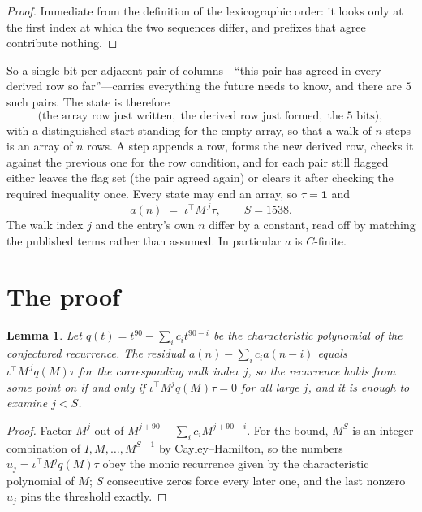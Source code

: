 \documentclass[11pt,a4paper]{article}
\theoremstyle{plain}
\newtheorem{lemma}[theorem]{Lemma}
\theoremstyle{definition}
\begin{document}
\begin{proof}
Immediate from the definition of the lexicographic order: it looks only at the first index at
which the two sequences differ, and prefixes that agree contribute nothing.
\end{proof}

So a single bit per adjacent pair of columns---``this pair has agreed in every derived row so
far''---carries everything the future needs to know, and there are $5$ such pairs. The state
is therefore
\[
\bigl(\text{the array row just written},\; \text{the derived row just formed},\;
\text{the 5 bits}\bigr),
\]
with a distinguished start standing for the empty array, so that a walk of $n$ steps is an array
of $n$ rows. A step appends a row, forms the new derived row, checks it against the previous one
for the row condition, and for each pair still flagged either leaves the flag set (the pair
agreed again) or clears it after checking the required inequality once. Every state may end an
array, so $\tau=\mathbf{1}$ and
\[
a(n)\;=\;\iota^{\!\top}M^{\,j}\tau ,\qquad S=1538.
\]
The walk index $j$ and the entry's own $n$ differ by a constant, read off by matching the
published terms rather than assumed. In particular $a$ is $C$-finite.

\section{The proof}

\begin{lemma}\label{lem:crit}
Let $q(t)=t^{90}-\sum_i c_it^{90-i}$ be the characteristic polynomial of the
conjectured recurrence. The residual $a(n)-\sum_ic_ia(n-i)$ equals
$\iota^{\!\top}M^{\,j}q(M)\tau$ for the corresponding walk index $j$, so the recurrence
holds from some point on if and only if $\iota^{\!\top}M^{j}q(M)\tau=0$ for all large $j$,
and it is enough to examine $j<S$.
\end{lemma}

\begin{proof}
Factor $M^{j}$ out of $M^{j+90}-\sum_ic_iM^{j+90-i}$. For the bound, $M^{S}$
is an integer combination of $I,M,\dots,M^{S-1}$ by Cayley--Hamilton, so the numbers
$u_j=\iota^{\!\top}M^{j}q(M)\tau$ obey the monic recurrence given by the characteristic
polynomial of $M$; $S$ consecutive zeros force every later one, and the last nonzero $u_j$
pins the threshold exactly.
\end{proof}
\end{document}
